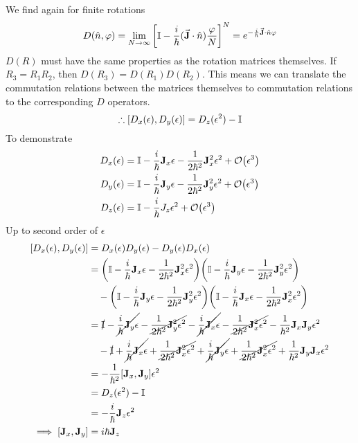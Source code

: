 \documentclass[12pt,a4paper,titlepage]{article}
\begin{document}
We find again for finite rotations
\begin{equation}
D(\hat{n},\varphi)=\lim_{N\rightarrow\infty}\qty[\mathbb{I}-\frac{i}{\hbar}(\vec{\vb{J}}\cdot\hat{n})\frac{\varphi}{N}]^{N}=e^{-\frac{i}{\hbar}\vec{\vb{J}}\cdot\hat{n}\varphi}
\end{equation}
$D(R)$ must have the same properties as the rotation matrices themselves. If $R_{3}=R_{1}R_{2}$, then $D(R_{3})=D(R_{1})D(R_{2})$. This means we can translate the commutation relations between the matrices themselves to commutation relations to the corresponding $D$ operators.
\begin{equation}
\therefore\comm{D_{x}(\epsilon)}{D_{y}(\epsilon)}=D_{z}(\epsilon^{2})-\mathbb{I}
\end{equation}
To demonstrate
\begin{equation}
\begin{aligned}
D_{x}(\epsilon)&=\mathbb{I}-\frac{i}{\hbar}\vb{J}_{x}\epsilon-\frac{1}{2\hbar^{2}}\vb{J}_{x}^{2}\epsilon^{2}+\order{\epsilon^{3}}\\
D_{y}(\epsilon)&=\mathbb{I}-\frac{i}{\hbar}\vb{J}_{y}\epsilon-\frac{1}{2\hbar^{2}}\vb{J}_{y}^{2}\epsilon^{2}+\order{\epsilon^{3}}\\
D_{z}(\epsilon)&=\mathbb{I}-\frac{i}{\hbar}J_{z}\epsilon^{2}+\order{\epsilon^{3}}
\end{aligned}
\end{equation}
Up to second order of $\epsilon$
\begin{equation}
\begin{aligned}
\comm{D_{x}(\epsilon)}{D_{y}(\epsilon)}&=D_{x}(\epsilon)D_{y}(\epsilon)-D_{y}(\epsilon)D_{x}(\epsilon)\\
&=\qty(\mathbb{I}-\frac{i}{\hbar}\vb{J}_{x}\epsilon-\frac{1}{2\hbar^{2}}\vb{J}_{x}^{2}\epsilon^{2})\qty(\mathbb{I}-\frac{i}{\hbar}\vb{J}_{y}\epsilon-\frac{1}{2\hbar^{2}}\vb{J}_{y}^{2}\epsilon^{2})\\
&\quad-\qty(\mathbb{I}-\frac{i}{\hbar}\vb{J}_{y}\epsilon-\frac{1}{2\hbar^{2}}\vb{J}_{y}^{2}\epsilon^{2})\qty(\mathbb{I}-\frac{i}{\hbar}\vb{J}_{x}\epsilon-\frac{1}{2\hbar^{2}}\vb{J}_{x}^{2}\epsilon^{2})\\
&=\cancel{\mathbb{I}}-\cancel{\frac{i}{\hbar}\vb{J}_{y}\epsilon}-\cancel{\frac{1}{2\hbar^{2}}\vb{J}_{y}^{2}\epsilon^{2}}-\cancel{\frac{i}{\hbar}\vb{J}_{x}\epsilon}-\cancel{\frac{1}{2\hbar^{2}}\vb{J}_{x}^{2}\epsilon^{2}}-\frac{1}{\hbar^{2}}\vb{J}_{x}\vb{J}_{y}\epsilon^{2}\\
&\quad-\cancel{\mathbb{I}}+\cancel{\frac{i}{\hbar}\vb{J}_{x}\epsilon}+\cancel{\frac{1}{2\hbar^{2}}\vb{J}_{x}^{2}\epsilon^{2}}+\cancel{\frac{i}{\hbar}\vb{J}_{y}\epsilon}+\cancel{\frac{1}{2\hbar^{2}}\vb{J}_{x}^{2}\epsilon^{2}}+\frac{1}{\hbar^{2}}\vb{J}_{y}\vb{J}_{x}\epsilon^{2}\\
&=-\frac{1}{\hbar^{2}}\comm{\vb{J}_{x}}{\vb{J}_{y}}\epsilon^{2}\\
&=D_{z}(\epsilon^{2})-\mathbb{I}\\
&=-\frac{i}{\hbar}\vb{J}_{z}\epsilon^{2}\\
\implies \comm{\vb{J}_{x}}{\vb{J}_{y}}&=i\hbar\vb{J}_{z}
\end{aligned}
\end{equation}
\end{document}
